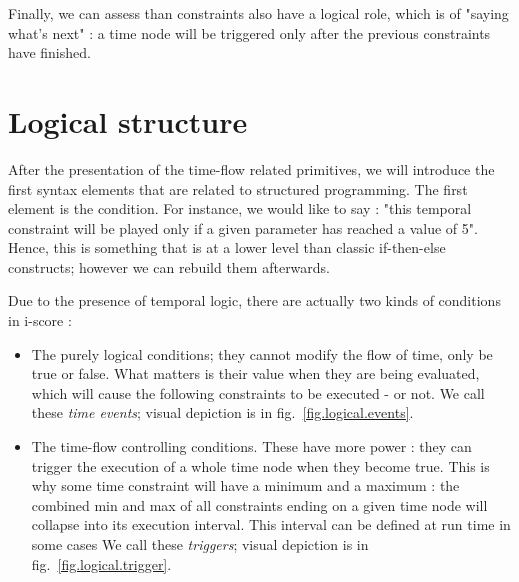 \documentclass{sigchi}
\begin{document}
Finally, we can assess than constraints also have a logical role, which is of "saying what's next" : a time node will be triggered only after the previous constraints have finished.




\section{Logical structure}\label{sec.structured}
After the presentation of the time-flow related primitives, we will introduce the first syntax elements that are related to structured programming.
The first element is the condition. For instance, we would like to say : "this temporal constraint will be played only if a given parameter has reached a value of 5".
Hence, this is something that is at a lower level than classic if-then-else constructs; however we can rebuild them afterwards.

Due to the presence of temporal logic, there are actually two kinds of conditions in i-score : 
\begin{itemize}
	\item The purely logical conditions; they cannot modify the flow of time, only be true or false. What matters is their value when they are being evaluated, which will cause the following constraints to be executed - or not. We call these \textit{time events}; visual depiction is in fig.~\ref{fig.logical.events}.
	\item The time-flow controlling conditions. These have more power : they can trigger the execution of a whole time node when they become true. This is why some time constraint will have a minimum and a maximum : the combined min and max of all constraints ending on a given time node will collapse into its execution interval. This interval can be defined at run time in some cases %
	We call these \textit{triggers}; visual depiction is in fig.~\ref{fig.logical.trigger}.
\end{itemize}
\end{document}
